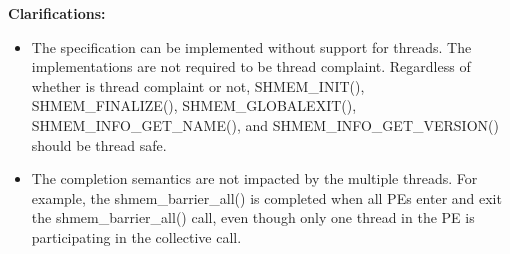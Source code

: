 {\bf Clarifications:}
 
\begin{itemize}
\item[]
The \openshmem{} specification can be implemented without support for threads.
The \openshmem{} implementations are not required to be thread complaint.
Regardless of whether \openshmem{} is thread complaint or not, SHMEM\_INIT(),
SHMEM\_FINALIZE(), SHMEM\_GLOBALEXIT(), SHMEM\_INFO\_GET\_NAME(), and
SHMEM\_INFO\_GET\_VERSION() should be thread safe.
 

\item[]
The completion semantics are not impacted by the multiple threads. 
For example, the shmem\_barrier\_all() is completed when all \acp{PE} enter and
exit the shmem\_barrier\_all() call, even though only one thread in the \ac{PE} is
participating in the collective call. 

 
\end{itemize}
